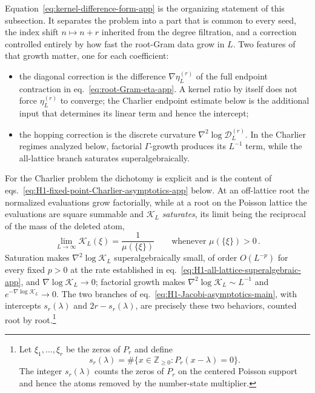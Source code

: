 \documentclass[a4paper,11pt]{article}
\def\ee{e}%
\theoremstyle{definition}
\theoremstyle{remark}
\newcommand{\ee}{\mathrm e}
\begin{document}
Equation~\eqref{eq:kernel-difference-form-app} is the organizing statement of this subsection. It
separates the problem into a part that is common to every seed, the index shift $n\mapsto n+r$
inherited from the degree filtration, and a correction controlled entirely by how fast
the root-Gram data grow in $L$. Two features of that growth matter, one for each coefficient:
\begin{itemize}[itemsep=1pt]
\item %
      the diagonal correction is the difference $\nabla\eta_L^{(r)}$ of the full endpoint
      contraction in eq.~\eqref{eq:root-Gram-eta-app}.  A kernel ratio by itself does not force
      $\eta_L^{(r)}$ to converge; the Charlier endpoint estimate below is the additional input
      that determines its linear term and hence the intercept;
\item %
      the hopping correction is the discrete curvature
      $\nabla^2\log\mathcal D_L^{(r)}$.  In the Charlier regimes analyzed below, factorial
      $\Gamma$-growth produces its $L^{-1}$ term, while the all-lattice branch saturates
      superalgebraically.
\end{itemize}
For the Charlier problem the dichotomy is explicit and is the content of
eqs.~\eqref{eq:H1-fixed-point-Charlier-asymptotics-app} below. At an off-lattice root the
normalized evaluations grow factorially, while at a root on the Poisson lattice the evaluations
are square summable and $\mathcal K_L$ \emph{saturates}, its limit being the reciprocal of the
mass of the deleted atom,
\begin{equation}
   \lim_{L\to\infty}\mathcal K_L(\xi)=\frac{1}{\mu(\{\xi\})}
   \qquad\text{whenever }\mu(\{\xi\})>0 \,.
   \label{eq:christoffel-atom-limit-app}
\end{equation}
Saturation makes $\nabla^2\log\mathcal K_L$ superalgebraically small, of order $O(L^{-p})$ for every
fixed $p>0$ at the rate established in
eq.~\eqref{eq:H1-all-lattice-superalgebraic-app}, and $\nabla\log\mathcal K_L\to0$; factorial
growth makes $\nabla^2\log\mathcal K_L\sim L^{-1}$ and $\ee^{-\nabla\log\mathcal K_L}\to0$. The
two branches of eq.~\eqref{eq:H1-Jacobi-asymptotics-main}, with intercepts $s_r(\lambda)$ and
$2r-s_r(\lambda)$, are precisely these two behaviors, counted root by root.\footnote{Let $\xi_1,\ldots,\xi_r$ be the zeros of $P_r$ and define
\begin{equation}
   s_r(\lambda)=
   \#\bigl\{x\in\mathbb Z_{\ge0}:P_r(x-\lambda)=0\bigr\}.
   \label{eq:H1-support-zero-count-app}
\end{equation}
The integer $s_r(\lambda)$ counts the zeros of $P_r$ on the centered Poisson support and hence the atoms removed by the number-state multiplier.} 
\end{document}
